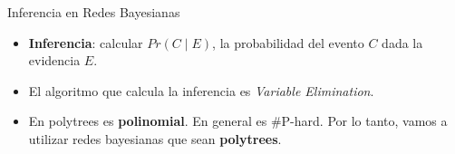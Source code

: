 \begin{frame}{Inferencia en Redes Bayesianas}
\begin{itemize}[<+- | alert@+>]
    \item \textbf{Inferencia}: calcular $Pr(C \mid E)$, la probabilidad del evento $C$ dada la evidencia $E$.
       
    \item El algoritmo que calcula la inferencia es \textit{Variable Elimination}.
    \item En polytrees es \textbf{polinomial}. En general es \#P-hard. Por lo tanto, vamos a utilizar redes bayesianas que sean \textbf{polytrees}. 
\end{itemize}
\end{frame}

